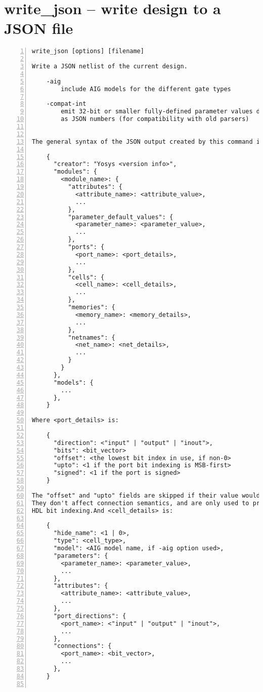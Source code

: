 \section{write\_json -- write design to a JSON file}
\label{cmd:write_json}
\begin{lstlisting}[numbers=left,frame=single]
    write_json [options] [filename]

Write a JSON netlist of the current design.

    -aig
        include AIG models for the different gate types

    -compat-int
        emit 32-bit or smaller fully-defined parameter values directly
        as JSON numbers (for compatibility with old parsers)


The general syntax of the JSON output created by this command is as follows:

    {
      "creator": "Yosys <version info>",
      "modules": {
        <module_name>: {
          "attributes": {
            <attribute_name>: <attribute_value>,
            ...
          },
          "parameter_default_values": {
            <parameter_name>: <parameter_value>,
            ...
          },
          "ports": {
            <port_name>: <port_details>,
            ...
          },
          "cells": {
            <cell_name>: <cell_details>,
            ...
          },
          "memories": {
            <memory_name>: <memory_details>,
            ...
          },
          "netnames": {
            <net_name>: <net_details>,
            ...
          }
        }
      },
      "models": {
        ...
      },
    }

Where <port_details> is:

    {
      "direction": <"input" | "output" | "inout">,
      "bits": <bit_vector>
      "offset": <the lowest bit index in use, if non-0>
      "upto": <1 if the port bit indexing is MSB-first>
      "signed": <1 if the port is signed>
    }

The "offset" and "upto" fields are skipped if their value would be 0.
They don't affect connection semantics, and are only used to preserve original
HDL bit indexing.And <cell_details> is:

    {
      "hide_name": <1 | 0>,
      "type": <cell_type>,
      "model": <AIG model name, if -aig option used>,
      "parameters": {
        <parameter_name>: <parameter_value>,
        ...
      },
      "attributes": {
        <attribute_name>: <attribute_value>,
        ...
      },
      "port_directions": {
        <port_name>: <"input" | "output" | "inout">,
        ...
      },
      "connections": {
        <port_name>: <bit_vector>,
        ...
      },
    }


\end{lstlisting}
